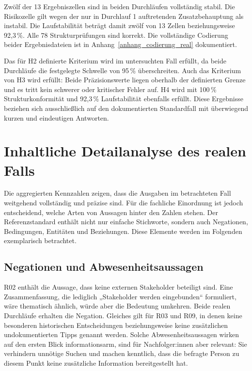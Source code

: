 \documentclass[
  10pt,
  ngerman,
  a4paper,
  toc=graduated,
  numbers=noenddot,
  headings=standardclasses,
  nonumberlist
]{scrartcl}
\newcommand{\pct}[1]{#1\,\%}
\begin{document}
Zwölf der 13 Ergebniszellen sind in beiden Durchläufen vollständig stabil. Die Risikozelle gilt wegen der nur in Durchlauf 1 auftretenden Zusatzbehauptung als instabil. Die Laufstabilität beträgt damit zwölf von 13 Zellen beziehungsweise \pct{92{,}3}. Alle 78 Strukturprüfungen sind korrekt. Die vollständige Codierung beider Ergebnisdateien ist in Anhang~\ref{anhang_codierung_real} dokumentiert.

Das für H2 definierte Kriterium wird im untersuchten Fall erfüllt, da beide Durchläufe die festgelegte Schwelle von \pct{95} überschreiten. Auch das Kriterium von H3 wird erfüllt: Beide Präzisionswerte liegen oberhalb der definierten Grenze und es tritt kein schwerer oder kritischer Fehler auf. H4 wird mit \pct{100} Strukturkonformität und \pct{92{,}3} Laufstabilität ebenfalls erfüllt. Diese Ergebnisse beziehen sich ausschließlich auf den dokumentierten Standardfall mit überwiegend kurzen und eindeutigen Antworten.

\section{Inhaltliche Detailanalyse des realen Falls}

Die aggregierten Kennzahlen zeigen, dass die Ausgaben im betrachteten Fall weitgehend vollständig und präzise sind. Für die fachliche Einordnung ist jedoch entscheidend, welche Arten von Aussagen hinter den Zahlen stehen. Der Referenzstandard enthält nicht nur einfache Stichworte, sondern auch Negationen, Bedingungen, Entitäten und Beziehungen. Diese Elemente werden im Folgenden exemplarisch betrachtet.

\subsection{Negationen und Abwesenheitsaussagen}

R02 enthält die Aussage, dass keine externen Stakeholder beteiligt sind. Eine Zusammenfassung, die lediglich „Stakeholder werden eingebunden“ formuliert, wäre thematisch ähnlich, würde aber die Bedeutung umkehren. Beide realen Durchläufe erhalten die Negation. Gleiches gilt für R03 und R09, in denen keine besonderen historischen Entscheidungen beziehungsweise keine zusätzlichen undokumentierten Tipps genannt werden. Solche Abwesenheitsaussagen wirken auf den ersten Blick informationsarm, sind für Nachfolger:innen aber relevant: Sie verhindern unnötige Suchen und machen kenntlich, dass die befragte Person zu diesem Punkt keine zusätzliche Information bereitgestellt hat.
\end{document}
